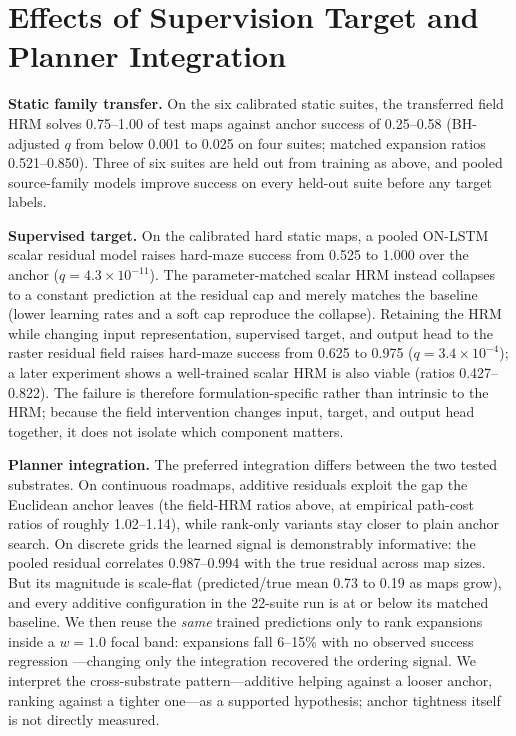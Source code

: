 \documentclass[letterpaper]{article} %
\begin{document}
\section{Effects of Supervision Target and Planner Integration}

\textbf{Static family transfer.} On the six calibrated static suites, the transferred field HRM solves 0.75--1.00 of test maps against anchor success of 0.25--0.58 (BH-adjusted $q$ from below 0.001 to 0.025 on four suites; matched expansion ratios 0.521--0.850). Three of six suites are held out from training as above, and pooled source-family models improve success on every held-out suite before any target labels.

\textbf{Supervised target.} On the calibrated hard static maps, a pooled ON-LSTM scalar residual model raises hard-maze success from 0.525 to 1.000 over the anchor ($q=4.3\times10^{-11}$). The parameter-matched scalar HRM instead collapses to a constant prediction at the residual cap and merely matches the baseline (lower learning rates and a soft cap reproduce the collapse). Retaining the HRM while changing input representation, supervised target, and output head to the raster residual field raises hard-maze success from 0.625 to 0.975 ($q=3.4\times10^{-4}$); a later experiment shows a well-trained scalar HRM is also viable (ratios 0.427--0.822). The failure is therefore formulation-specific rather than intrinsic to the HRM; because the field intervention changes input, target, and output head together, it does not isolate which component matters.

\textbf{Planner integration.} The preferred integration differs between the two tested substrates. On continuous roadmaps, additive residuals exploit the gap the Euclidean anchor leaves (the field-HRM ratios above, at empirical path-cost ratios of roughly 1.02--1.14), while rank-only variants stay closer to plain anchor search. On discrete grids the learned signal is demonstrably informative: the pooled residual correlates 0.987--0.994 with the true residual across map sizes. But its magnitude is scale-flat (predicted/true mean 0.73 to 0.19 as maps grow), and every additive configuration in the 22-suite run is at or below its matched baseline. We then reuse the \emph{same} trained predictions only to rank expansions inside a $w{=}1.0$ focal band: expansions fall 6--15\% with no observed success regression \citep{chrestien2023rank}---changing only the integration recovered the ordering signal. We interpret the cross-substrate pattern---additive helping against a looser anchor, ranking against a tighter one---as a supported hypothesis; anchor tightness itself is not directly measured.
\end{document}
